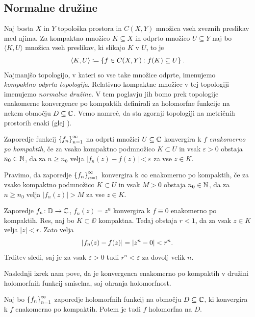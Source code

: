 \subsection{Normalne družine}

Naj bosta \(X\) in \(Y\) topološka prostora in \(C (X, Y)\) množica vseh zveznih preslikav med njima. Za kompaktno množico \(K \subseteq X\) in odprto množico \(U \subseteq Y\) naj bo \(\langle K, U \rangle\) množica vseh preslikav, ki slikajo \(K\) v \(U\), to je
\[\langle K, U \rangle \coloneq \left\{ f \in C (X, Y) : f (K) \subseteq U \right\}.\]
Najmanjšo topologijo, v kateri so vse take množice odprte, imenujemo \emph{kompaktno-odprta topologija}. Relativno kompaktne množice v tej topologiji imenujemo \emph{normalne družine}. V tem poglavju jih bomo prek topologije enakomerne konvergence po kompaktih definirali za holomorfne funkcije na nekem območju \(D \subseteq \mathbb C\). Vemo namreč, da sta zgornji topologiji na metričnih prostorih enaki (glej \cite[trditev 3.2]{Pavesic_2017}).
\begin{definicija}
    Zaporedje funkcij \(\left\{ f_n \right\}_{n = 1}^{\infty}\) na odprti množici \(U \subseteq \mathbb C\) konvergira k \(f\) \emph{enakomerno po kompaktih}, če za vsako kompaktno podmnožico \(K \subset U\) in vsak \(\varepsilon > 0\) obstaja \(n_0 \in \mathbb N\), da za \(n \geq n_0\) velja \(|f_n (z) - f(z)| < \varepsilon\) za vse \(z \in K\).

    Pravimo, da zaporedje \(\left\{ f_n \right\}_{n = 1}^{\infty}\) konvergira k \(\infty\) enakomerno po kompaktih, če za vsako kompaktno podmnožico \(K \subset U\) in vsak \(M > 0\) obstaja \(n_0 \in \mathbb N\), da za \(n \geq n_0\) velja \(|f_n (z)| > M\) za vse \(z \in K\).
\end{definicija}

\begin{primer} \label{ex:primer}
    Zaporedje \(f_n \colon \mathbb D \to \mathbb C\), \(f_n (z) = z^n\) konvergira k \(f \equiv 0\) enakomerno po kompaktih. Res, naj bo \(K \subset \DD\) kompaktna. Tedaj obstaja \(r < 1\), da za vsak \(z \in K\) velja \(|z| < r\). Zato velja
    \[\left\lvert f_n (z) - f (z)\right\rvert = \left\lvert z^n - 0\right\rvert < r^n.\]
    Trditev sledi, saj je za vsak \(\varepsilon > 0\) tudi \(r^n < \varepsilon\) za dovolj velik \(n\).
\end{primer}

\noindent Naslednji izrek nam pove, da je konvergenca enakomerno po kompaktih v družini holomorfnih funkcij smiselna, saj ohranja holomorfnost.

\begin{izrek} \label{thm:holepk}
    Naj bo \(\left\{ f_n \right\}_{n = 1}^{\infty}\) zaporedje holomorfnih funkcij na območju \(D \subseteq \mathbb C\), ki konvergira k \(f\) enakomerno po kompaktih. Potem je tudi \(f\) holomorfna na \(D\).
\end{izrek}

